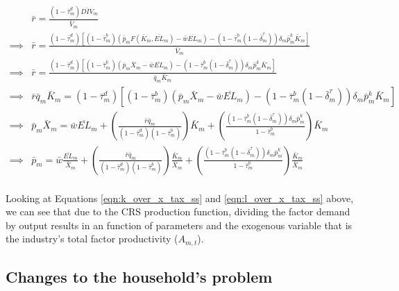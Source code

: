 \documentclass[letterpaper,12pt]{article}
\theoremstyle{definition}
\begin{document}
\begin{spacing}{1.5}
 \begin{equation}
 \label{eqn:p_dynamic_tax_ss}
\begin{split}
& \bar{r}  =  \frac{(1-\bar{\tau}^{d}_{m})\overline{DIV}_{m}}{\bar{V}_{m}} \\
\implies &  \bar{r}  =  \frac{(1-\bar{\tau}^{d}_{m})\left[(1-\bar{\tau}^{b}_{m})\left(\bar{p}_{m}F(\bar{K}_{m},\overline{EL}_{m}) - \bar{w}\overline{EL}_{m}\right) - (1-\bar{\tau}^{b}_{m}(1-\bar{\delta}^{\tau}_{m}))\delta_{m}\bar{p}^{k}_{m}\bar{K}_{m}\right]}{\bar{V}_{m}} \\
\implies &  \bar{r}  =  \frac{(1-\bar{\tau}^{d}_{m})\left[(1-\bar{\tau}^{b}_{m})\left(\bar{p}_{m}\bar{X}_{m} - \bar{w}\overline{EL}_{m}\right) - (1-\bar{\tau}^{b}_{m}(1-\bar{\delta}^{\tau}_{m}))\delta_{m}\bar{p}^{k}_{m}\bar{K}_{m}\right]}{\bar{q}_{m}\bar{K}_{m}} \\
\implies &  \bar{r}\bar{q}_{m}\bar{K}_{m}  =  (1-\bar{\tau}^{d}_{m})\left[(1-\bar{\tau}^{b}_{m})\left(\bar{p}_{m}\bar{X}_{m} - \bar{w}\overline{EL}_{m}\right) - (1-\bar{\tau}^{b}_{m}(1-\bar{\delta}^{\tau}_{m}))\delta_{m}\bar{p}^{k}_{m}\bar{K}_{m}\right] \\
\implies &  \bar{p}_{m}\bar{X}_{m} = \bar{w}\overline{EL}_{m} + \left(\frac{\bar{r}\bar{q}_{m}}{(1-\bar{\tau}^{d}_{m})(1-\bar{\tau}^{b}_{m})}\right)\bar{K}_{m} + \left(\frac{(1-\bar{\tau}^{b}_{m}(1-\bar{\delta}^{\tau}_{m}))\delta_{m}\bar{p}^{k}_{m}}{1-\bar{\tau}^{b}_{m}}\right)\bar{K}_{m} \\
\implies &  \bar{p}_{m} = \bar{w}\frac{\overline{EL}_{m}}{\bar{X}_{m}} + \left(\frac{\bar{r}\bar{q}_{m}}{(1-\bar{\tau}^{d}_{m})(1-\bar{\tau}^{b}_{m})}\right)\frac{\bar{K}_{m}}{\bar{X}_{m}} + \left(\frac{(1-\bar{\tau}^{b}_{m}(1-\bar{\delta}^{\tau}_{m}))\delta_{m}\bar{p}^{k}_{m}}{1-\bar{\tau}^{b}_{m}}\right)\frac{\bar{K}_{m}}{\bar{X}_{m}} \\
\end{split}
\end{equation}

Looking at Equations \ref{eqn:k_over_x_tax_ss} and \ref{eqn:l_over_x_tax_ss} above, we can see that due to the CRS production function, dividing the factor demand by output results in an function of parameters and the exogenous variable that is the industry's total factor productivity ($A_{m,t}$).


\subsection*{Changes to the household's problem}


\end{spacing}
\end{document}
